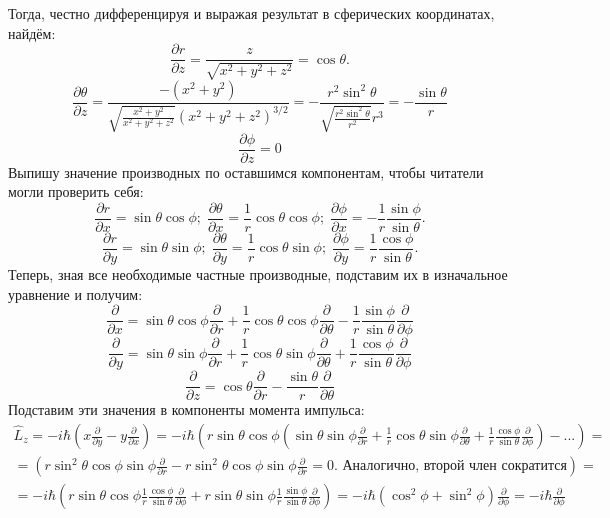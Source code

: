 Тогда, честно дифференцируя и выражая результат в сферических координатах, найдём:
\[
\frac{\partial r}{\partial z} = \frac{z}{\sqrt{x^2 + y^2 + z^2}} = \cos\theta.
\]
\[
\frac{\partial \theta}{\partial z} = \frac{-(x^2+y^2)}{\sqrt{\frac{x^2 + y^2}{x^2+y^2+z^2}}(x^2+y^2+z^2)^{3/2}}= -\frac{r^2\sin^2\theta}{\sqrt{\frac{r^2\sin^2\theta}{r^2}}r^3} = -\frac{\sin\theta}{r} 
\]
\[
\frac{\partial \phi}{\partial z} = 0
\]
Выпишу значение производных по оставшимся компонентам, чтобы читатели могли проверить себя:
\[
\frac{\partial r}{\partial x} = \sin\theta\cos\phi; \; \frac{\partial \theta}{\partial x} = \frac{1}{r}\cos\theta\cos\phi; \; \frac{\partial \phi}{\partial x} = -\frac{1}{r}\frac{\sin\phi}{\sin\theta}.
\]
\[
\frac{\partial r}{\partial y} = \sin\theta\sin\phi; \; \frac{\partial \theta}{\partial y} = \frac{1}{r}\cos\theta\sin\phi; \; \frac{\partial \phi}{\partial y} = \frac{1}{r}\frac{\cos\phi}{\sin\theta}.
\]
Теперь, зная все необходимые частные производные, подставим их в изначальное уравнение и получим:
\[
\frac{\partial }{\partial x} = \sin\theta\cos\phi\frac{\partial}{\partial r} + \frac{1}{r}\cos\theta\cos\phi\frac{\partial}{\partial \theta} -\frac{1}{r}\frac{\sin\phi}{\sin\theta}\frac{\partial}{\partial\phi}
\]
\[
\frac{\partial }{\partial y} = \sin\theta\sin\phi\frac{\partial}{\partial r} + \frac{1}{r}\cos\theta\sin\phi\frac{\partial}{\partial \theta} +\frac{1}{r}\frac{\cos\phi}{\sin\theta}\frac{\partial}{\partial\phi}
\]
\[
\frac{\partial }{\partial z} = \cos\theta\frac{\partial}{\partial r} -\frac{\sin\theta}{r}\frac{\partial}{\partial \theta}
\]
Подставим эти значения в компоненты момента импульса:
\begin{multline*}
\hat{L}_z = -i\hbar(x\frac{\partial}{\partial y} - y\frac{\partial}{\partial x}) = -i\hbar\left(r\sin\theta\cos\phi\left(\sin\theta\sin\phi\frac{\partial}{\partial r} + \frac{1}{r}\cos\theta\sin\phi\frac{\partial}{\partial \theta} +\frac{1}{r}\frac{\cos\phi}{\sin\theta}\frac{\partial}{\partial\phi}\right) - ...\right) = \\
= \left(r\sin^2\theta \cos\phi \sin\phi \frac{\partial}{\partial r} - r\sin^2\theta\cos\phi\sin\phi\frac{\partial}{\partial r} = 0. \text{ Аналогично, второй член сократится}\right) =\\ = -i\hbar\left(r\sin\theta\cos\phi\frac{1}{r}\frac{\cos\phi}{\sin\theta}\frac{\partial}{\partial \phi} + r\sin\theta\sin\phi\frac{1}{r}\frac{\sin\phi}{\sin\theta}\frac{\partial}{\partial \phi} \right) = -i\hbar \left(\cos^2\phi+\sin^2\phi\right)\frac{\partial}{\partial \phi} = -i\hbar\frac{\partial}{\partial \phi}
\end{multline*}
